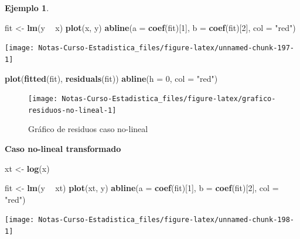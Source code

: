 \documentclass[
  12pt,
]{book}
\newenvironment{Shaded}{\begin{snugshade}}{\end{snugshade}}
\newcommand{\DataTypeTok}[1]{\textcolor[rgb]{0.13,0.29,0.53}{#1}}
\newcommand{\DecValTok}[1]{\textcolor[rgb]{0.00,0.00,0.81}{#1}}
\newcommand{\KeywordTok}[1]{\textcolor[rgb]{0.13,0.29,0.53}{\textbf{#1}}}
\newcommand{\NormalTok}[1]{#1}
\newcommand{\OperatorTok}[1]{\textcolor[rgb]{0.81,0.36,0.00}{\textbf{#1}}}
\newcommand{\StringTok}[1]{\textcolor[rgb]{0.31,0.60,0.02}{#1}}
\theoremstyle{definition}
\theoremstyle{definition}
\newtheorem{example}{Ejemplo}[chapter]
\theoremstyle{definition}
\theoremstyle{remark}
\begin{document}
\begin{example}
\begin{Shaded}
\begin{Highlighting}[]
\NormalTok{fit <-}\StringTok{ }\KeywordTok{lm}\NormalTok{(y }\OperatorTok{~}\StringTok{ }\NormalTok{x)}
\KeywordTok{plot}\NormalTok{(x, y)}
\KeywordTok{abline}\NormalTok{(}\DataTypeTok{a =} \KeywordTok{coef}\NormalTok{(fit)[}\DecValTok{1}\NormalTok{], }\DataTypeTok{b =} \KeywordTok{coef}\NormalTok{(fit)[}\DecValTok{2}\NormalTok{], }\DataTypeTok{col =} \StringTok{"red"}\NormalTok{)}
\end{Highlighting}
\end{Shaded}

\begin{center}\texttt{[image: Notas-Curso-Estadistica\_files/figure-latex/unnamed-chunk-197-1]} \end{center}

\begin{Shaded}
\begin{Highlighting}[]
\KeywordTok{plot}\NormalTok{(}\KeywordTok{fitted}\NormalTok{(fit), }\KeywordTok{residuals}\NormalTok{(fit))}
\KeywordTok{abline}\NormalTok{(}\DataTypeTok{h =} \DecValTok{0}\NormalTok{, }\DataTypeTok{col =} \StringTok{"red"}\NormalTok{)}
\end{Highlighting}
\end{Shaded}

\begin{figure}

{\centering \texttt{[image: Notas-Curso-Estadistica\_files/figure-latex/grafico-residuos-no-lineal-1]} 

}

\caption{Gráfico de residuos caso no-lineal}\label{fig:grafico-residuos-no-lineal}
\end{figure}

\textbf{Caso no-lineal transformado}

\begin{Shaded}
\begin{Highlighting}[]
\NormalTok{xt <-}\StringTok{ }\KeywordTok{log}\NormalTok{(x)}


\NormalTok{fit <-}\StringTok{ }\KeywordTok{lm}\NormalTok{(y }\OperatorTok{~}\StringTok{ }\NormalTok{xt)}
\KeywordTok{plot}\NormalTok{(xt, y)}
\KeywordTok{abline}\NormalTok{(}\DataTypeTok{a =} \KeywordTok{coef}\NormalTok{(fit)[}\DecValTok{1}\NormalTok{], }\DataTypeTok{b =} \KeywordTok{coef}\NormalTok{(fit)[}\DecValTok{2}\NormalTok{], }\DataTypeTok{col =} \StringTok{"red"}\NormalTok{)}
\end{Highlighting}
\end{Shaded}

\begin{center}\texttt{[image: Notas-Curso-Estadistica\_files/figure-latex/unnamed-chunk-198-1]} \end{center}


\end{example}
\end{document}
